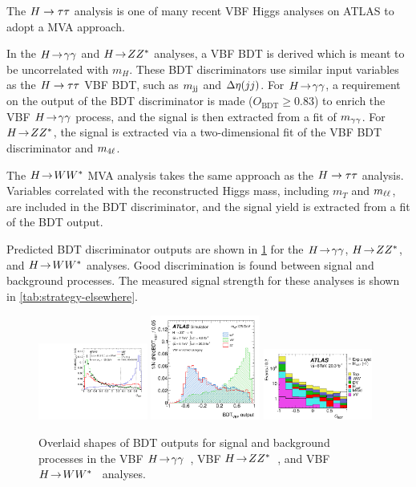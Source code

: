 The $H\rightarrow\tau\tau$ analysis is one of many recent VBF Higgs analyses on ATLAS to adopt a MVA approach.

In the $H \!\rightarrow\! \gamma\gamma$ and $H \!\rightarrow\! ZZ^\ast$ analyses, a VBF BDT is derived which is meant to be uncorrelated with $m_H$. These BDT discriminators use similar input variables as the $H\rightarrow\tau\tau$ VBF BDT, such as $m_{\text{jj}}$ and $\deta$. For $H \!\rightarrow\! \gamma\gamma$, a requirement on the output of the BDT discriminator is made ($O_\text{BDT} \ge 0.83$) to enrich the VBF $H \!\rightarrow\! \gamma\gamma$ process, and the signal is then extracted from a fit of $m_{\gamma\gamma}$. For $H \!\rightarrow\! ZZ^\ast$, the signal is extracted via a two-dimensional fit of the VBF BDT discriminator and $m_{4\ell}$.

The $H \!\rightarrow\! WW^\ast$ MVA analysis takes the same approach as the $H\rightarrow\tau\tau$ analysis. Variables correlated with the reconstructed Higgs mass, including $m_T$ and $m_{\ell\ell}$, are included in the BDT discriminator, and the signal yield is extracted from a fit of the BDT output. 

Predicted BDT discriminator outputs are shown in \cref{fig:strategy-elsewhere} for the $H \!\rightarrow\! \gamma\gamma$, $H \!\rightarrow\! ZZ^\ast$, and $H \!\rightarrow\! WW^\ast$ analyses. Good discrimination is found between signal and background processes. The measured signal strength for these analyses is shown in \cref{tab:strategy-elsewhere}.

\begin{figure}[tp]
  \centering
  \includegraphics[width=0.32\textwidth]{figures/HIGG-2013-08/fig_06}
  \includegraphics[width=0.32\textwidth]{figures/HIGG-2013-21/fig_09f}
  \includegraphics[width=0.32\textwidth]{figures/HIGG-2013-13/fig_46a}
  \caption{Overlaid shapes of BDT outputs for signal and background processes in the VBF $H \!\rightarrow\! \gamma\gamma$~\cite{HIGG-2013-08}, VBF $H \!\rightarrow\! ZZ^\ast$~\cite{HIGG-2013-21}, and VBF $H \!\rightarrow\! WW^\ast$~\cite{HIGG-2013-13} analyses.}
  \label{fig:strategy-elsewhere}
\end{figure}

